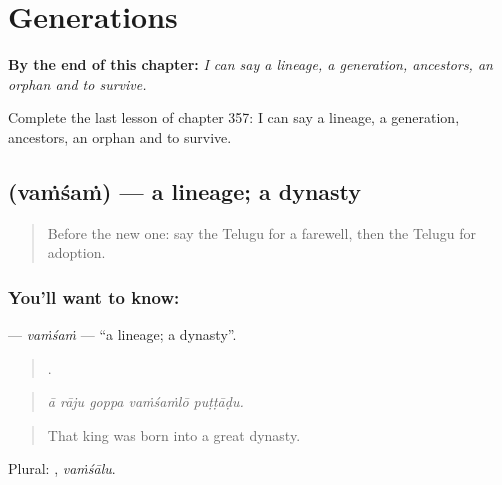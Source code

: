
\chapter{Generations}
\label{ch:te-generations}

\begin{chapteropening}
\textbf{By the end of this chapter:} \emph{I can say a lineage, a generation, ancestors, an orphan and to survive.}

Complete the last lesson of chapter 357: I can say a lineage, a generation, ancestors, an orphan and to survive.
\end{chapteropening}

\section[\texorpdfstring{\te{వంశం} (vaṁśaṁ)}{వంశం (vaṁśaṁ)}]{ (vaṁśaṁ) — a lineage; a dynasty}

\label{lesson:TE-C357-vamsam}



\begin{quote}
Before the new one: say the Telugu for a farewell, then the Telugu for adoption.
\end{quote}

\subsection*{You'll want to know: }
\textbf{} — \emph{vaṁśaṁ} — \textquotedblleft{}a lineage; a dynasty\textquotedblright{}.

\begin{quote}
    .
\end{quote}

\begin{quote}
\emph{ā rāju goppa vaṁśaṁlō puṭṭāḍu.}
\end{quote}

\begin{quote}
That king was born into a great dynasty.
\end{quote}

Plural: , \emph{vaṁśālu}.

